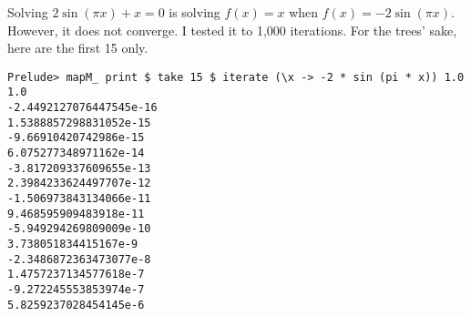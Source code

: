 Solving $2 \sin(\pi x) + x = 0$ is solving $f(x) = x$ when $f(x) = -2
\sin(\pi x)$.  However, it does not converge.  I tested it to 1,000
iterations.  For the trees' sake, here are the first 15 only.

\begin{verbatim}
Prelude> mapM_ print $ take 15 $ iterate (\x -> -2 * sin (pi * x)) 1.0
1.0
-2.4492127076447545e-16
1.5388857298831052e-15
-9.66910420742986e-15
6.075277348971162e-14
-3.817209337609655e-13
2.3984233624497707e-12
-1.506973843134066e-11
9.468595909483918e-11
-5.949294269809009e-10
3.738051834415167e-9
-2.3486872363473077e-8
1.4757237134577618e-7
-9.272245553853974e-7
5.8259237028454145e-6
\end{verbatim}
